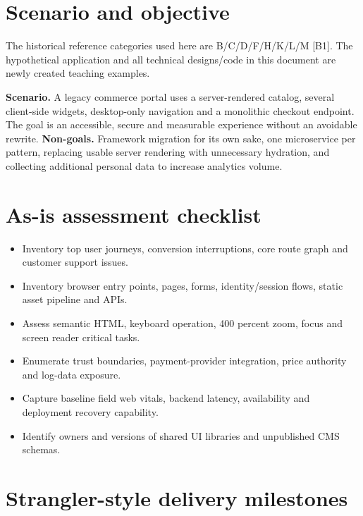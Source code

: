 \documentclass[11pt]{article}
\begin{document}
\MakeFront
\section{Scenario and objective}

\Provenance
\begin{groundedbox}The historical reference categories used here are B/C/D/F/H/K/L/M [B1]. The hypothetical application and all technical designs/code in this document are newly created teaching examples.\end{groundedbox}
\textbf{Scenario.} A legacy commerce portal uses a server-rendered catalog, several client-side widgets, desktop-only navigation and a monolithic checkout endpoint. The goal is an accessible, secure and measurable experience without an avoidable rewrite.
\textbf{Non-goals.} Framework migration for its own sake, one microservice per pattern, replacing usable server rendering with unnecessary hydration, and collecting additional personal data to increase analytics volume.

\section{As-is assessment checklist}
\begin{itemize}
\item Inventory top user journeys, conversion interruptions, core route graph and customer support issues.
\item Inventory browser entry points, pages, forms, identity/session flows, static asset pipeline and APIs.
\item Assess semantic HTML, keyboard operation, 400 percent zoom, focus and screen reader critical tasks.
\item Enumerate trust boundaries, payment-provider integration, price authority and log-data exposure.
\item Capture baseline field web vitals, backend latency, availability and deployment recovery capability.
\item Identify owners and versions of shared UI libraries and unpublished CMS schemas.
\end{itemize}

\section{Strangler-style delivery milestones}
\end{document}
